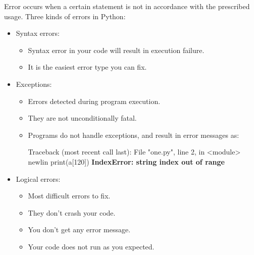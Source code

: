 \setlength{\columnsep}{3pt}
\begin{flushleft}
	\bigskip

	Error occurs when a certain statement is not in accordance with the prescribed usage.
	\newline
	Three kinds of errors in Python: 
	\begin{itemize}
		\item Syntax errors:
		\begin{itemize}
			\item Syntax error in your code will result in execution failure. 
			\item It is the easiest error type you can fix.
		\end{itemize}
	
		\bigskip
		\item Exceptions:
		\begin{itemize}
			\item Errors detected during program execution.
			\item They are not unconditionally fatal.
			\item Programs do not handle exceptions, and result in error messages as:
			
			\begin{tcolorbox}[breakable,notitle,boxrule=-0pt,colback=error,colframe=error]
				\color{white}
				Traceback (most recent call last):
				\newline
				File "one.py", line 2, in <module>
				newlin	
				print(a[120])
				\newline
				\textbf{IndexError: string index out of range}
				\font=4pt
			\end{tcolorbox}		
			
			
		\end{itemize}
		
		\bigskip
		\item Logical errors: 
		\begin{itemize}
			\item Most difficult errors to fix.
			\item They don’t crash your code.
			\item You don’t get any error message.
			\item Your code does not run as you expected.
		\end{itemize}
		
		
	\end{itemize}
	
	

	
\end{flushleft}

\newpage

